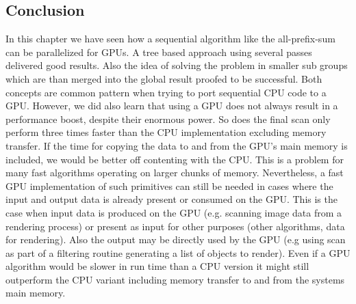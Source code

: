 \subsection{Conclusion}
In this chapter we have seen how a sequential algorithm like the all-prefix-sum can be parallelized for GPUs. A tree based approach using several passes delivered good results. Also the idea of solving the problem in smaller sub groups which are than merged into the global result proofed to be successful. Both concepts are common pattern when trying to port sequential CPU code to a GPU. However, we did also learn that using a GPU does not always result in a performance boost, despite their enormous power. So does the final scan only perform three times faster than the CPU implementation excluding memory transfer. If the time for copying the data to and from the GPU's main memory is included, we would be better off contenting with the CPU. This is a problem for many fast algorithms operating on larger chunks of memory. Nevertheless, a fast GPU implementation of such primitives can still be needed in cases where the input and output data is already present or consumed on the GPU. This is the case when input data is produced on the GPU (e.g. scanning image data from a rendering process) or present as input for other purposes (other algorithms, data for rendering). Also the output may be directly used by the GPU (e.g using scan as part of a filtering routine generating a list of objects to render). Even if a GPU algorithm would be slower in run time than a CPU version it might still outperform the CPU variant including memory transfer to and from the systems main memory.
